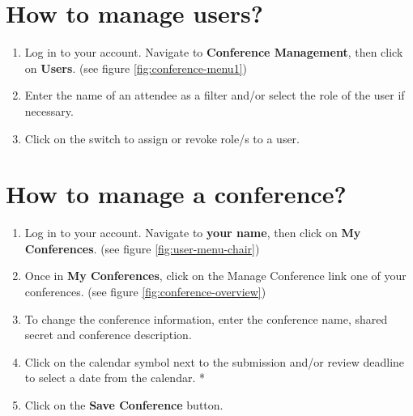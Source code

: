 \documentclass[nochapterpage,nopartpage,noheadingspace,numbersubsubsec,bigchapter,colorback,accentcolor=tud9c,10pt]{tudreport}
\begin{document}
	\section{How to manage users?}


\begin{enumerate}
	\item	Log in to your account. Navigate to \textbf{Conference Management}, then click on \textbf{Users}. (see figure \ref{fig:conference-menu1})
	\item	Enter the name of an attendee as a filter and/or select the role of the user if necessary.
	\item	Click on the switch to assign or revoke role/s to a user.
\end{enumerate}

	\section{How to manage a conference?}


\begin{enumerate}
	\item	Log in to your account. Navigate to \textbf{your name}, then click on \textbf{My Conferences}. (see figure \ref{fig:user-menu-chair})
	\item	Once in \textbf{My Conferences}, click on the Manage Conference link one of your conferences. (see figure \ref{fig:conference-overview})
	\item	To change the conference information, enter the conference name, shared secret and conference description.
	\item	Click on the calendar symbol next to the submission and/or review deadline to select a date from the calendar. *
	\item	Click on the \textbf{Save Conference} button.
\end{enumerate}

\end{document}
